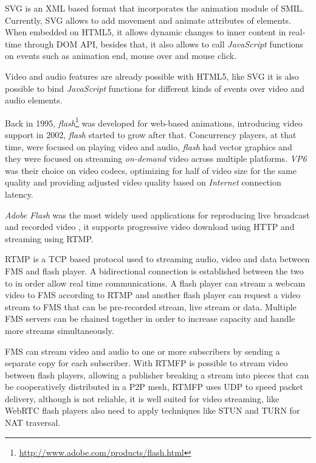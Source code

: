   \ac{SVG} is an \ac{XML} based format that incorporates the animation module of \ac{SMIL}. Currently, \ac{SVG} allows to add movement and animate attributes of elements. When embedded on \ac{HTML}5, it allows dynamic changes to inner content in real-time through \ac{DOM} \ac{API}, besides that, it also allows to call \textit{JavaScript} functions on events such as animation end, mouse over and mouse click.

  Video and audio features are already possible with \ac{HTML}5, like \ac{SVG} it is also possible to bind \textit{JavaScript} functions for different kinds of events over video and audio elements.

  Back in 1995, \textit{flash}\footnote{\url{http://www.adobe.com/products/flash.html}} was developed for web-based animations, introducing video support in 2002, \textit{flash} started to grow after that. Concurrency players, at that time, were focused on playing video and audio, \textit{flash} had vector graphics and they were focused on streaming \textit{on-demand} video across multiple platforms. \textit{VP6} was their choice on video codecs, optimizing for half of video size for the same quality and providing adjusted video quality based on \textit{Internet} connection latency. 

  \textit{Adobe Flash} was the most widely used applications for reproducing live broadcast and recorded video \cite{flashvideo}, it supports progressive video download using \ac{HTTP} and streaming using \ac{RTMP}. 

  \ac{RTMP} is a \ac{TCP} based protocol used to streaming audio, video and data between \ac{FMS} and flash player. A bidirectional connection is established between the two to in order allow real time communications. A flash player can stream a webcam video to \ac{FMS} according to \ac{RTMP} and another flash player can request a video stream to \ac{FMS} that can be pre-recorded stream, live stream or data. Multiple \ac{FMS} servers can be chained together in order to increase capacity and handle more streams simultaneously.

  \ac{FMS} can stream video and audio to one or more subscribers by sending a separate copy for each subscriber. With \ac{RTMFP} is possible to stream video between flash players, allowing a publisher breaking a stream into pieces that can be cooperatively distributed in a P2P mesh, \ac{RTMFP} uses \ac{UDP} to speed packet delivery, although is not reliable, it is well suited for video streaming, like \ac{WebRTC} flash players also need to apply techniques like \ac{STUN} and \ac{TURN} for \ac{NAT} traversal.

